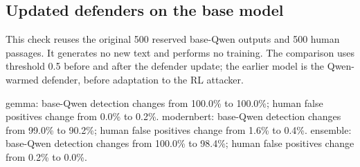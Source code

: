 \subsection{Updated defenders on the base
model}\label{record-docs-research-results-md-updated-defenders-on-the-base-model}

This check reuses the original 500 reserved base-Qwen outputs and 500
human passages. It generates no new text and performs no training. The
comparison uses threshold 0.5 before and after the defender update; the
earlier model is the Qwen-warmed defender, before adaptation to the RL
attacker.

gemma: base-Qwen detection changes from 100.0\% to 100.0\%; human false
positives change from 0.0\% to 0.2\%. modernbert: base-Qwen detection
changes from 99.0\% to 90.2\%; human false positives change from 1.6\%
to 0.4\%. ensemble: base-Qwen detection changes from 100.0\% to 98.4\%;
human false positives change from 0.2\% to 0.0\%.

